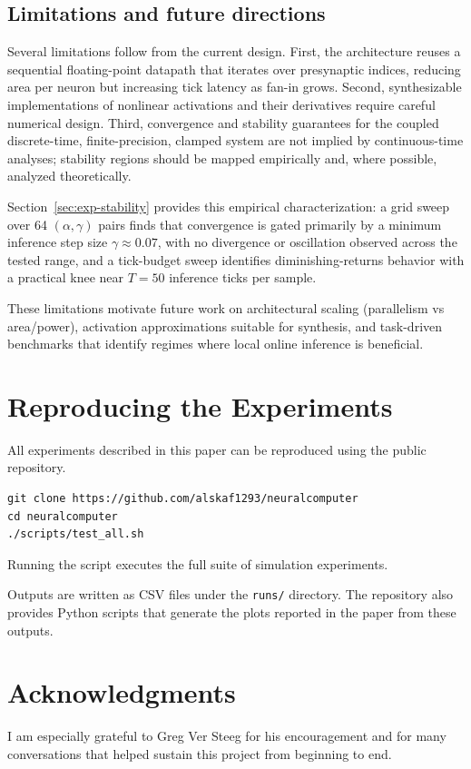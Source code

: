 \documentclass{article}
\begin{document}
\subsection{Limitations and future directions}

Several limitations follow from the current design. First, the architecture reuses a sequential floating-point datapath that iterates over presynaptic indices, reducing area per neuron but increasing tick latency as fan-in grows. Second, synthesizable implementations of nonlinear activations and their derivatives require careful numerical design. Third, convergence and stability guarantees for the coupled discrete-time, finite-precision, clamped system are not implied by continuous-time analyses; stability regions should be mapped empirically and, where possible, analyzed theoretically.

Section~\ref{sec:exp-stability} provides this empirical characterization: a
grid sweep over 64 \((\alpha,\gamma)\) pairs finds that convergence is gated
primarily by a minimum inference step size \(\gamma \approx 0.07\), with no
divergence or oscillation observed across the tested range, and a tick-budget
sweep identifies diminishing-returns behavior with a practical knee near
\(T = 50\) inference ticks per sample.

These limitations motivate future work on architectural scaling (parallelism vs area/power), activation approximations suitable for synthesis, and task-driven benchmarks that identify regimes where local online inference is beneficial.

\appendix
\section{Reproducing the Experiments}

All experiments described in this paper can be reproduced using the public
repository.

\begin{verbatim}
git clone https://github.com/alskaf1293/neuralcomputer
cd neuralcomputer
./scripts/test_all.sh
\end{verbatim}

Running the script executes the full suite of simulation experiments.

Outputs are written as CSV files under the \texttt{runs/} directory. The
repository also provides Python scripts that generate the plots reported in
the paper from these outputs.

\section*{Acknowledgments}

I am especially grateful to Greg Ver Steeg for his encouragement and for many conversations that helped sustain this project from beginning to end.



\end{document}
